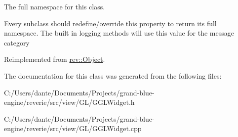 The full namespace for this class. 

Every subclass should redefine/override this property to return its full namespace. The built in logging methods will use this value for the message category 

Reimplemented from \mbox{\hyperlink{classrev_1_1_object_aaeb638d3e10f361c56c211a318a27f3d}{rev\+::\+Object}}.



The documentation for this class was generated from the following files\+:\begin{DoxyCompactItemize}
\item 
C\+:/\+Users/dante/\+Documents/\+Projects/grand-\/blue-\/engine/reverie/src/view/\+G\+L/G\+G\+L\+Widget.\+h\item 
C\+:/\+Users/dante/\+Documents/\+Projects/grand-\/blue-\/engine/reverie/src/view/\+G\+L/G\+G\+L\+Widget.\+cpp\end{DoxyCompactItemize}
